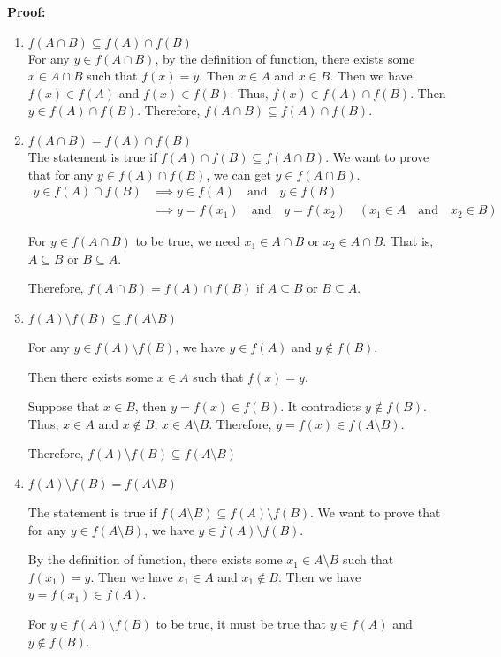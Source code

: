 \documentclass[12pt]{article}
\newcommand{\fasb}{
f(A) \cap f(B)
}
\newcommand{\fab}{
f(A \cap B)
}
\newcommand{\fxab}{
    f(A) \setminus f(B)
}
\newcommand{\faxb}{
    f(A \setminus B)
}
\newcommand{\fxstTwo}{
\fxab \subseteq \faxb
}
\newcommand{\fxstThree}{
\fxab = \faxb
}
\newcommand{\fxstFour}{
\faxb \subseteq \fxab
}
\begin{document}
\textbf{Proof:}
\renewcommand{\labelenumi}{\alph{enumi})}
\renewcommand{\labelenumii}{\arabic{enumii})}
\begin{enumerate}
    \item \(f(A \cap B) \subseteq f(A) \cap f(B)\)\\
    For any \(y \in f(A \cap B)\), by the definition of function, there exists some \(x \in A \cap B\) such that \(f(x) = y \).
    Then \(x \in A\) and \(x \in B\). Then we have \(f(x) \in f(A)\) and \(f(x) \in f(B)\). Thus, \(f(x) \in f(A) \cap f(B)\).
    Then \(y \in f(A) \cap f(B)\). Therefore, \(f(A \cap B) \subseteq f(A) \cap f(B)\).
    \item \(\fab = \fasb \)\\
    The statement is true if \(\fasb \subseteq \fab\). We want to prove that for any \(y \in \fasb\),
    we can get \(y \in \fab\).
    \begin{equation}
        \begin{aligned}
        y \in \fasb & \implies y \in f(A) \quad \text{and} \quad y \in f(B)\\
        & \implies y = f(x_1) \quad \text{and} \quad y = f(x_2) \quad
        (x_1 \in A \quad \text{and} \quad  x_2 \in B)
        \end{aligned}
    \end{equation}

    For \(y \in \fab\) to be true, we need \(x_1 \in A \cap B\) or \(x_2 \in A \cap B\).
    That is, \(A \subseteq B\) or \(B \subseteq A\).

    Therefore, \(\fab = \fasb\) if \(A \subseteq B\) or \(B \subseteq A\).

    \item \(\fxstTwo\)

    For any \(y \in \fxab\), we have \(y \in f(A)\) and \(y \notin f(B)\).

    Then there exists some \(x \in A\) such that \(f(x)=y\).

    Suppose that \(x \in B\), then \(y = f(x) \in f(B)\). It contradicts \(y \notin f(B)\).
    Thus, \(x \in A\) and \(x \notin B\); \(x \in A \setminus B\). Therefore, \(y = f(x) \in \faxb\).

    Therefore, \(\fxstTwo\)

    \item \(\fxstThree\)

    The statement is true if \(\fxstFour\). We want to prove that for any \(y \in \faxb\), we have
    \(y \in \fxab\).

    By the definition of function, there exists some \(x_1 \in A \setminus B\) such that \(f(x_1)=y\).
    Then we have \(x_1 \in A\) and \(x_1 \notin B\). Then we have \(y= f(x_1) \in f(A)\).

    For \(y \in \fxab\) to be true, it must be true that \(y \in f(A)\) and \(y \notin f(B)\).


\end{enumerate}
\end{document}
